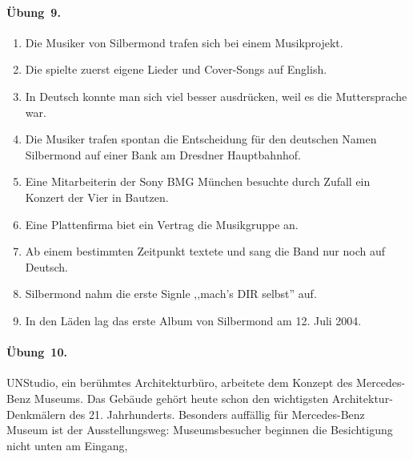\paragraph*{Übung~9.}
\begin{enumerate}
    \item Die Musiker von Silbermond trafen sich bei einem Musikprojekt.
    \item Die spielte zuerst eigene Lieder und Cover-Songs auf English.
    \item In Deutsch konnte man sich viel besser ausdrücken, weil es die Muttersprache war.
    \item Die Musiker trafen spontan die Entscheidung für den deutschen Namen Silbermond auf einer Bank am Dresdner Hauptbahnhof.
    \item Eine Mitarbeiterin der Sony BMG München besuchte durch Zufall ein Konzert der Vier in Bautzen.
    \item Eine Plattenfirma biet ein Vertrag die Musikgruppe an.
    \item Ab einem bestimmten Zeitpunkt textete und sang die Band nur noch auf Deutsch.
    \item Silbermond nahm die erste Signle ,,mach's DIR selbst'' auf.
    \item In den Läden lag das erste Album von Silbermond am 12. Juli 2004.
\end{enumerate}
\paragraph*{Übung~10.}
UNStudio, ein berühmtes Architekturbüro, arbeitete  dem Konzept des Mercedes-Benz Museums. Das Gebäude gehört heute schon  den wichtigsten Architektur-Denkmälern des 21. Jahrhunderts. Besonders auffällig für Mercedes-Benz Museum ist der Ausstellungsweg: Museumsbesucher beginnen die Besichtigung nicht unten am Eingang, 
